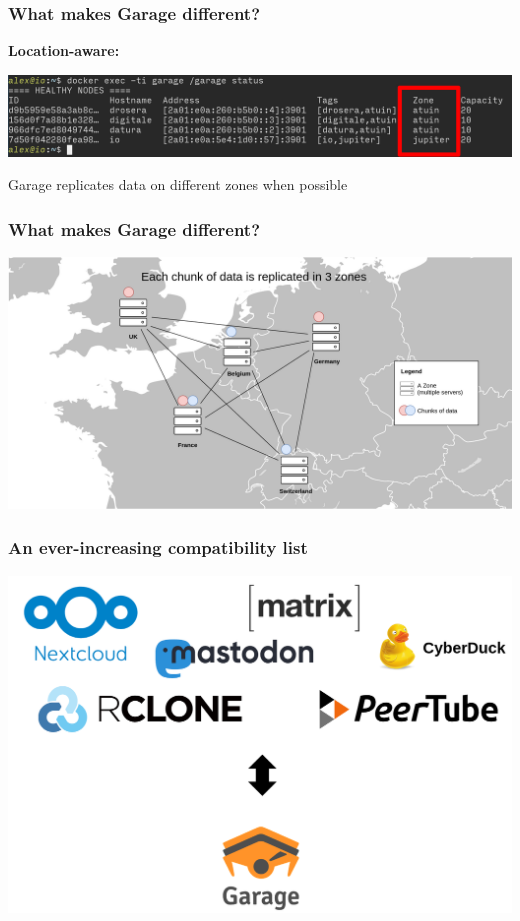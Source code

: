 \documentclass[aspectratio=169]{beamer}
\begin{document}
\begin{frame}
	\frametitle{What makes Garage different?}
	\textbf{Location-aware:}
	\vspace{2em}
		\begin{center}
			\includegraphics[width=\linewidth]{assets/location-aware.png}
		\end{center}
	\vspace{2em}
	Garage replicates data on different zones when possible
\end{frame}

\begin{frame}
	\frametitle{What makes Garage different?}
		\begin{center}
			\includegraphics[width=.8\linewidth]{assets/map.png}
		\end{center}
\end{frame}

\begin{frame}
	\frametitle{An ever-increasing compatibility list}
		\begin{center}
			\includegraphics[width=.7\linewidth]{assets/compatibility.png}
		\end{center}
\end{frame}
\end{document}

